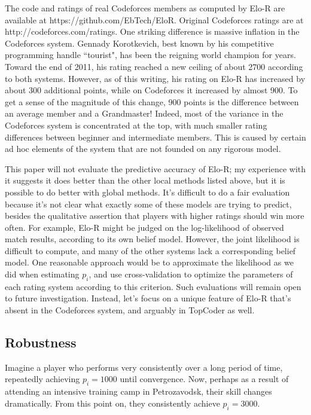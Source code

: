 \documentclass{article}
\begin{document}
The code and ratings of real Codeforces members as computed by Elo-R are available at https://github.com/EbTech/EloR. Original Codeforces ratings are at http://codeforces.com/ratings. One striking difference is massive inflation in the Codeforces system. Gennady Korotkevich, best known by his competitive programming handle ``tourist", has been the reigning world champion for years. Toward the end of 2011, his rating reached a new ceiling of about 2700 according to both systems. However, as of this writing, his rating on Elo-R has increased by about 300 additional points, while on Codeforces it increased by almost 900. To get a sense of the magnitude of this change, 900 points is the difference between an average member and a Grandmaster! Indeed, most of the variance in the Codeforces system is concentrated at the top, with much smaller rating differences between beginner and intermediate members. This is caused by certain ad hoc elements of the system that are not founded on any rigorous model.

This paper will not evaluate the predictive accuracy of Elo-R; my experience with it suggests it does better than the other local methods listed above, but it is possible to do better with global methods. It's difficult to do a fair evaluation because it's not clear what exactly some of these models are trying to predict, besides the qualitative assertion that players with higher ratings should win more often. For example, Elo-R might be judged on the log-likelihood of observed match results, according to its own belief model. However, the joint likelihood is difficult to compute, and many of the other systems lack a corresponding belief model. One reasonable approach would be to approximate the likelihood as we did when estimating $p_i$, and use cross-validation to optimize the parameters of each rating system according to this criterion. Such evaluations will remain open to future investigation. Instead, let's focus on a unique feature of Elo-R that's absent in the Codeforces system, and arguably in TopCoder as well.

\subsection{Robustness}

Imagine a player who performs very consistently over a long period of time, repeatedly achieving $p_i = 1000$ until convergence. Now, perhaps as a result of attending an intensive training camp in Petrozavodsk, their skill changes dramatically. From this point on, they consistently achieve $p_i = 3000$.
\end{document}
